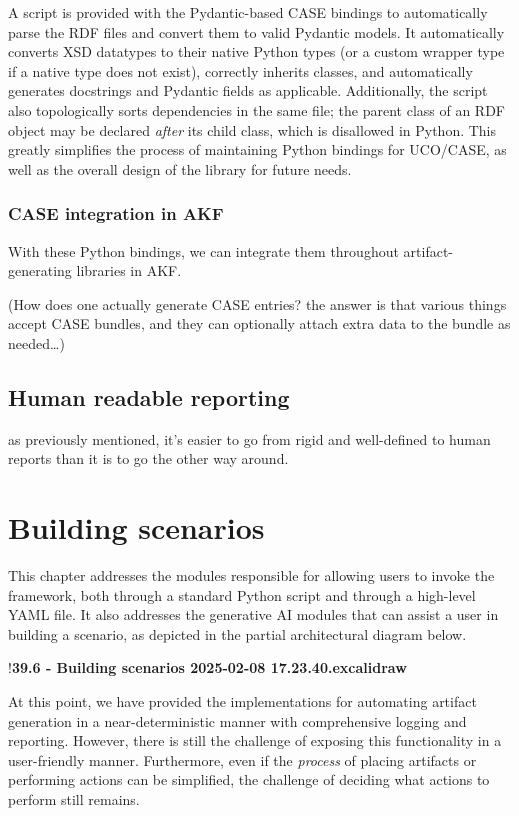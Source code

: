\documentclass[letterpaper,12pt]{report}
\begin{document}
A script is provided with the Pydantic-based CASE bindings to
automatically parse the RDF files and convert them to valid Pydantic
models. It automatically converts XSD datatypes to their native Python
types (or a custom wrapper type if a native type does not exist),
correctly inherits classes, and automatically generates docstrings and
Pydantic fields as applicable. Additionally, the script also
topologically sorts dependencies in the same file; the parent class of
an RDF object may be declared \emph{after} its child class, which is
disallowed in Python. This greatly simplifies the process of maintaining
Python bindings for UCO/CASE, as well as the overall design of the
library for future needs.

\subsection{CASE integration in
AKF}\label{case-integration-in-akf}

With these Python bindings, we can integrate them throughout
artifact-generating libraries in AKF.

(How does one actually generate CASE entries? the answer is that various
things accept CASE bundles, and they can optionally attach extra data to
the bundle as needed\ldots)

\section{Human readable reporting}\label{human-readable-reporting}

as previously mentioned, it's easier to go from rigid and well-defined
to human reports than it is to go the other way around.

\chapter{Building scenarios}\label{chapter-six}

This chapter addresses the modules responsible for allowing users to
invoke the framework, both through a standard Python script and through
a high-level YAML file. It also addresses the generative AI modules that
can assist a user in building a scenario, as depicted in the partial
architectural diagram below.

!\textbf{39.6 - Building scenarios 2025-02-08 17.23.40.excalidraw}

At this point, we have provided the implementations for automating
artifact generation in a near-deterministic manner with comprehensive
logging and reporting. However, there is still the challenge of exposing
this functionality in a user-friendly manner. Furthermore, even if the
\emph{process} of placing artifacts or performing actions can be
simplified, the challenge of deciding what actions to perform still
remains.
\end{document}
